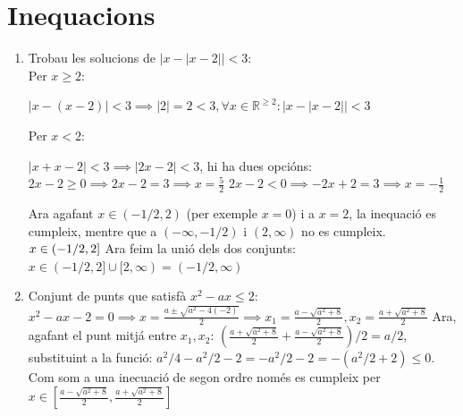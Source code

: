 \section{Inequacions}

\begin{enumerate}
    \item Trobau les solucions de $|x-|x-2||<3$:\\
Per $x\ge 2$:

$|x-(x-2)|<3 \implies |2|=2<3, \forall x\in \mathbb{R}^{\ge2}: |x-|x-2||<3$

Per $x<2$: 

$|x+x-2|<3 \implies |2x-2|<3$, hi ha dues opcións:\\

$2x-2\ge0 \implies 2x-2=3 \implies x=\frac{5}{2}$
$2x-2<0 \implies -2x+2=3 \implies x=-\frac{1}{2}$

Ara agafant $x\in (-1/2, 2)$ (per exemple $x=0$) i a $x=2$, la inequació es cumpleix, mentre que a $(-\infty, -1/2 )$ i $(2, \infty)$ no es cumpleix. $x\in (-1/2, 2]\\$
Ara feim la unió dels dos conjunts: $x\in (-1/2, 2]\cup [2, \infty)= (-1/2, \infty)$

    \item Conjunt de punts que satisfà $x^2-ax\le2$: 
    $x^2-ax-2=0 \implies x=\frac{a\pm \sqrt{a^2-4(-2)}}{2} \implies x_1=\frac{a- \sqrt{a^2+8}}{2}, x_2=\frac{a+ \sqrt{a^2+8}}{2}$ 
Ara, agafant el punt mitjá entre $x_1, x_2$: $(\frac{a+ \sqrt{a^2+8}}{2}+\frac{a- \sqrt{a^2+8}}{2})/2=a/2$, substituint a la funció: $a^2/4 - a^2/2-2 = -a^2/2-2=-(a^2/2+2)\le 0$. Com som a una inecuació de segon ordre només es cumpleix per $x\in [\frac{a- \sqrt{a^2+8}}{2},\frac{a+ \sqrt{a^2+8}}{2}]$
    


    
\end{enumerate}
